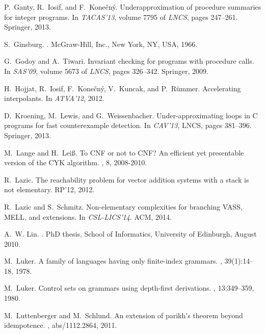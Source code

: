 \documentclass[final]{llncs}
\begin{document}
\begin{thebibliography}{10}
P.~Ganty, R.~Iosif, and F.~Kone\v{c}n\'{y}.
\newblock Underapproximation of procedure summaries for integer programs.
\newblock In {\em TACAS'13}, volume 7795 of {\em LNCS}, pages 247--261.
  Springer, 2013.

S.~Ginsburg.
.
\newblock McGraw-Hill, Inc., New York, NY, USA, 1966.

G.~Godoy and A.~Tiwari.
\newblock Invariant checking for programs with procedure calls.
\newblock In {\em SAS'09}, volume 5673 of {\em LNCS}, pages 326--342.
  Springer, 2009.

H.~Hojjat, R.~Iosif, F.~Kone\v{c}n\'{y}, V.~Kuncak, and P.~R\"ummer.
\newblock Accelerating interpolants.
\newblock In {\em ATVA'12}, 2012.

D.~Kroening, M.~Lewis, and G.~Weissenbacher.
\newblock Under-approximating loops in {C} programs for fast counterexample
  detection.
\newblock In {\em CAV'13}, LNCS, pages 381--396. Springer, 2013.

M.~Lange and H.~Lei{\ss}.
\newblock To \uppercase{CNF} or not to \uppercase{CNF}? {A}n efficient yet
  presentable version of the \uppercase{CYK} algorithm.
, 8, 2008-2010.

R.~Lazic.
\newblock The reachability problem for vector addition systems with a stack is
  not elementary.
\newblock RP'12, 2012.

R.~Lazic and S.~Schmitz.
\newblock Non-elementary complexities for branching {VASS}, {MELL}, and
  extensions.
\newblock In {\em CSL-LICS'14}. ACM, 2014.

A.~W. Lin.
.
\newblock PhD thesis, School of Informatics, University of Edinburgh, August
  2010.

M.~Luker.
\newblock A family of languages having only finite-index grammars.
, 39(1):14--18, 1978.

M.~Luker.
\newblock Control sets on grammars using depth-first derivations.
, 13:349--359, 1980.

M.~Luttenberger and M.~Schlund.
\newblock An extension of parikh's theorem beyond idempotence.
, abs/1112.2864, 2011.


\end{thebibliography}
\end{document}
